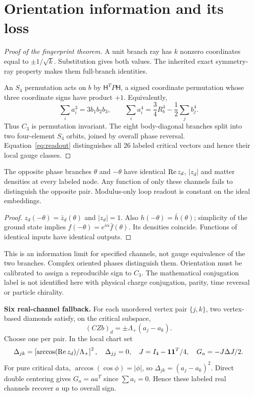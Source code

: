 \documentclass[11pt,a4paper]{article}
\begin{document}
\section{Orientation information and its loss}
\begin{proof}[Proof of the fingerprint theorem]
A unit branch ray has $k$ nonzero coordinates equal to $\pm1/\sqrt k$. Substitution gives both values. The inherited exact symmetry-ray property makes them full-branch identities.

An $S_4$ permutation acts on $b$ by $\mathsf H^TP\mathsf H$, a signed coordinate permutation whose three coordinate signs have product $+1$. Equivalently,
\[
\sum_i a_i^3=3b_1b_2b_3,\qquad
\sum_i a_i^4=\frac34R_b^4-\frac12\sum_jb_j^4.
\]
Thus $C_3$ is permutation invariant. The eight body-diagonal branches split into two four-element $S_4$ orbits, joined by overall phase reversal. Equation~\eqref{eq:readout} distinguishes all 26 labeled critical vectors and hence their local gauge classes.
\end{proof}
\begin{proposition}
The opposite phase branches $\theta$ and $-\theta$ have identical $\operatorname{Re} z_d$, $|z_d|$ and matter densities at every labeled node. Any function of only these channels fails to distinguish the opposite pair. Modulus-only loop readout is constant on the ideal embeddings.
\end{proposition}
\begin{proof}
$z_d(-\theta)=\bar z_d(\theta)$ and $|z_d|=1$. Also $h(-\theta)=\bar h(\theta)$; simplicity of the ground state implies $f(-\theta)=e^{i\alpha}\bar f(\theta)$. Its densities coincide. Functions of identical inputs have identical outputs.
\end{proof}
This is an information limit for specified channels, not gauge equivalence of the two branches. Complex oriented phases distinguish them. Orientation must be calibrated to assign a reproducible sign to $C_3$. The mathematical conjugation label is not identified here with physical charge conjugation, parity, time reversal or particle chirality.

\textbf{Six real-channel fallback.} For each unordered vertex pair $\{j,k\}$, two vertex-based diamonds satisfy, on the critical subspace,
\[
(CZb)_d=\pm\Lambda_+(a_j-a_k).
\]
Choose one per pair. In the local chart set
\[
\Delta_{jk}=\left[\arccos(\operatorname{Re} z_d)/\Lambda_+\right]^2,\quad\Delta_{jj}=0,
\quad J=I_4-\mathbf1\mathbf1^T/4,\quad G_a=-J\Delta J/2.
\]
For pure critical data, $\arccos(\cos\phi)=|\phi|$, so $\Delta_{jk}=(a_j-a_k)^2$. Direct double centering gives $G_a=aa^T$ since $\sum a_i=0$. Hence these labeled real channels recover $a$ up to overall sign.
\end{document}
